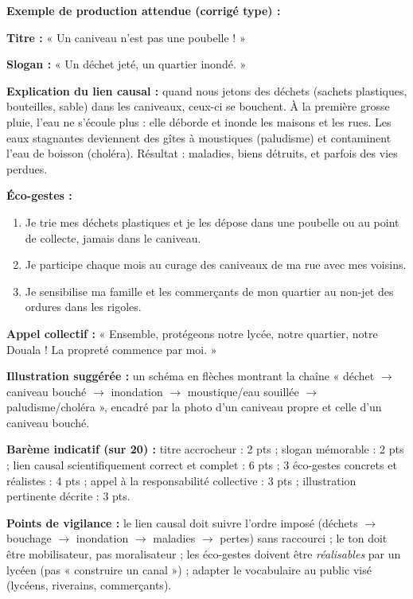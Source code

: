 \documentclass[11pt]{article}
\begin{document}
\begin{corrige}
\textbf{Exemple de production attendue (corrigé type) :}

\textbf{Titre :} « Un caniveau n'est pas une poubelle ! »

\textbf{Slogan :} « Un déchet jeté, un quartier inondé. »

\textbf{Explication du lien causal :} quand nous jetons des déchets (sachets plastiques, bouteilles, sable) dans les caniveaux, ceux-ci se bouchent. À la première grosse pluie, l'eau ne s'écoule plus : elle déborde et inonde les maisons et les rues. Les eaux stagnantes deviennent des gîtes à moustiques (paludisme) et contaminent l'eau de boisson (choléra). Résultat : maladies, biens détruits, et parfois des vies perdues.

\textbf{Éco-gestes :}
\begin{enumerate}
\item Je trie mes déchets plastiques et je les dépose dans une poubelle ou au point de collecte, jamais dans le caniveau.
\item Je participe chaque mois au curage des caniveaux de ma rue avec mes voisins.
\item Je sensibilise ma famille et les commerçants de mon quartier au non-jet des ordures dans les rigoles.
\end{enumerate}

\textbf{Appel collectif :} « Ensemble, protégeons notre lycée, notre quartier, notre Douala ! La propreté commence par moi. »

\textbf{Illustration suggérée :} un schéma en flèches montrant la chaîne « déchet $\rightarrow$ caniveau bouché $\rightarrow$ inondation $\rightarrow$ moustique/eau souillée $\rightarrow$ paludisme/choléra », encadré par la photo d'un caniveau propre et celle d'un caniveau bouché.

\textbf{Barème indicatif (sur 20) :} titre accrocheur : 2 pts ; slogan mémorable : 2 pts ; lien causal scientifiquement correct et complet : 6 pts ; 3 éco-gestes concrets et réalistes : 4 pts ; appel à la responsabilité collective : 3 pts ; illustration pertinente décrite : 3 pts.

\textbf{Points de vigilance :} le lien causal doit suivre l'ordre imposé (déchets $\rightarrow$ bouchage $\rightarrow$ inondation $\rightarrow$ maladies $\rightarrow$ pertes) sans raccourci ; le ton doit être mobilisateur, pas moralisateur ; les éco-gestes doivent être \emph{réalisables} par un lycéen (pas « construire un canal ») ; adapter le vocabulaire au public visé (lycéens, riverains, commerçants).
\end{corrige}
\end{document}
